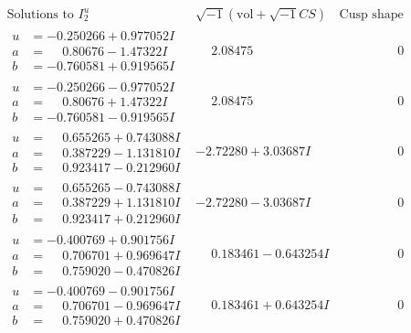 \documentclass[1p]{elsarticle_modified}
\theoremstyle{definition}
\newcommand{\I}{\sqrt{-1}}
\begin{document}
$$\begin{array}{c|c|c}  
\text{Solutions to }I^u_{2}& \I (\text{vol} + \sqrt{-1}CS) & \text{Cusp shape}\\
 \hline 
\begin{aligned}
u &= -0.250266 + 0.977052 I \\
a &= \phantom{-}0.80676 - 1.47322 I \\
b &= -0.760581 + 0.919565 I\end{aligned}
 & \phantom{-}2.08475\phantom{ +0.000000I} & \phantom{-0.000000 } 0 \\ \hline\begin{aligned}
u &= -0.250266 - 0.977052 I \\
a &= \phantom{-}0.80676 + 1.47322 I \\
b &= -0.760581 - 0.919565 I\end{aligned}
 & \phantom{-}2.08475\phantom{ +0.000000I} & \phantom{-0.000000 } 0 \\ \hline\begin{aligned}
u &= \phantom{-}0.655265 + 0.743088 I \\
a &= \phantom{-}0.387229 - 1.131810 I \\
b &= \phantom{-}0.923417 - 0.212960 I\end{aligned}
 & -2.72280 + 3.03687 I & \phantom{-0.000000 } 0 \\ \hline\begin{aligned}
u &= \phantom{-}0.655265 - 0.743088 I \\
a &= \phantom{-}0.387229 + 1.131810 I \\
b &= \phantom{-}0.923417 + 0.212960 I\end{aligned}
 & -2.72280 - 3.03687 I & \phantom{-0.000000 } 0 \\ \hline\begin{aligned}
u &= -0.400769 + 0.901756 I \\
a &= \phantom{-}0.706701 + 0.969647 I \\
b &= \phantom{-}0.759020 - 0.470826 I\end{aligned}
 & \phantom{-}0.183461 - 0.643254 I & \phantom{-0.000000 } 0 \\ \hline\begin{aligned}
u &= -0.400769 - 0.901756 I \\
a &= \phantom{-}0.706701 - 0.969647 I \\
b &= \phantom{-}0.759020 + 0.470826 I\end{aligned}
 & \phantom{-}0.183461 + 0.643254 I & \phantom{-0.000000 } 0 \\ \hline\begin{aligned}

\end{aligned}
\end{array}$$
\end{document}

